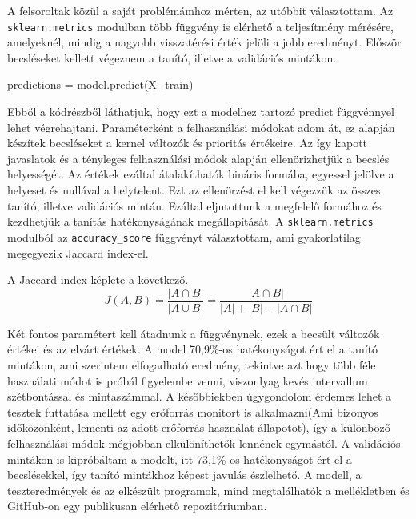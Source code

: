 A felsoroltak közül a saját problémámhoz mérten, az utóbbit választottam.
Az \texttt{sklearn.metrics} modulban több függvény is elérhető a teljesítmény mérésére, amelyeknél, mindig a nagyobb visszatérési érték jelöli a jobb eredményt.
Először becsléseket kellett végeznem a tanító, illetve a validációs mintákon.

\begin{python}
predictions = model.predict(X_train)
\end{python}

Ebből a kódrészből láthatjuk, hogy ezt a modelhez tartozó predict függvénnyel lehet végrehajtani. Paraméterként a felhasználási módokat adom át, ez alapján készítek becsléseket a kernel változók és prioritás értékeire. Az így kapott javaslatok és a tényleges felhasználási módok alapján ellenörizhetjük a becslés helyességét. Az értékek ezáltal átalakíthatók bináris formába, egyessel jelölve a helyeset és nullával a helytelent. Ezt az ellenörzést el kell végezzük az összes tanító, illetve validációs mintán.
Ezáltal eljutottunk a megfelelő formához és kezdhetjük a tanítás hatékonyságának megállapítását.
A \texttt{sklearn.metrics} modulból az \texttt{accuracy\_score} függvényt választottam, ami gyakorlatilag megegyezik Jaccard index-el.

A Jaccard index képlete a következő.
\begin{equation}
J(A,B) = \frac{|A \cap B|}{|A \cup B|} = \frac{|A \cap B|}{|A| + |B| - |A \cap B|}
\end{equation}

Két fontos paramétert kell átadnunk a függvénynek, ezek a becsült változók értékei és az elvárt értékek.
A model 70,9\%-os hatékonyságot ért el a tanító mintákon, ami szerintem elfogadható eredmény, tekintve azt hogy több féle használati módot is próbál figyelembe venni, viszonlyag kevés intervallum szétbontással és mintaszámmal. A későbbiekben úgygondolom érdemes lehet a tesztek futtatása mellett egy erőforrás monitort is alkalmazni(Ami bizonyos időközönként, lementi az adott erőforrás használat állapotot), így a különböző felhasználási módok mégjobban elkülöníthetők lennének egymástól.
A validációs mintákon is kipróbáltam a modelt, itt 73,1\%-os hatékonyságot ért el a becslésekkel, így tanító mintákhoz képest javulás észlelhető.
A modell, a teszteredmények és az elkészült programok, mind megtalálhatók a mellékletben és GitHub-on egy publikusan elérhető repozitóriumban.

